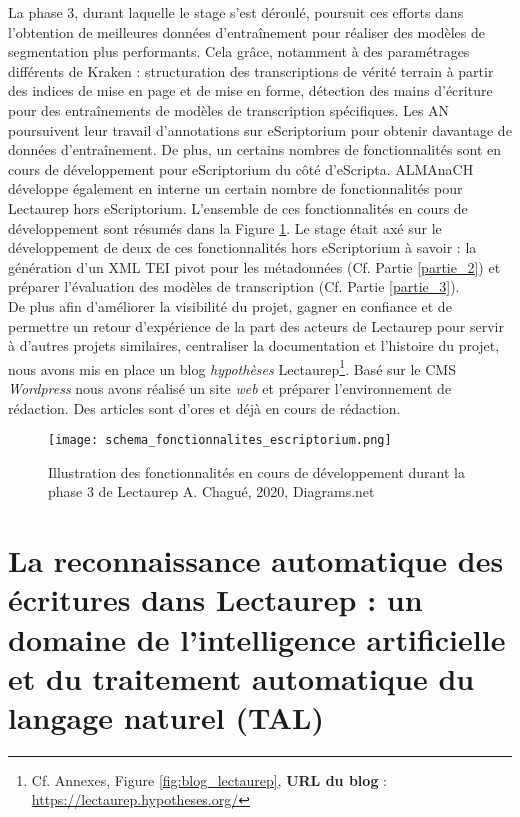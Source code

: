 La phase 3, durant laquelle le stage s'est déroulé, poursuit ces efforts dans l'obtention de meilleures données d'entraînement pour réaliser des modèles de segmentation plus performants. Cela grâce, notamment à des paramétrages différents de Kraken : structuration des transcriptions de vérité terrain à partir des indices de mise en page et de mise en forme, détection des mains d'écriture pour des entraînements de modèles de transcription spécifiques. Les AN poursuivent leur travail d'annotations sur eScriptorium pour obtenir davantage de données d'entraînement. De plus, un certains nombres de fonctionnalités sont en cours de développement pour eScriptorium du côté d'eScripta. ALMAnaCH développe également en interne un certain nombre de fonctionnalités pour Lectaurep hors eScriptorium. L'ensemble de ces fonctionnalités en cours de développement sont résumés dans la Figure \ref{fig:fonctionnalites_eScripto}. Le stage était axé sur le développement de deux de ces fonctionnalités hors eScriptorium à savoir : la génération d'un XML TEI pivot pour les métadonnées (Cf. Partie \ref{partie_2}) et préparer l'évaluation des modèles de transcription (Cf. Partie \ref{partie_3}).\\

De plus afin d'améliorer la visibilité du projet, gagner en confiance et de permettre un retour d'expérience de la part des acteurs de Lectaurep pour servir à d'autres projets similaires, centraliser la documentation et l'histoire du projet, nous avons mis en place un blog \textit{hypothèses} Lectaurep\footnote{Cf. Annexes, Figure \ref{fig:blog_lectaurep}, \textbf{URL du blog} : \url{https://lectaurep.hypotheses.org/}}. Basé sur le CMS \textit{Wordpress} nous avons réalisé un site \textit{web} et préparer l'environnement de rédaction. Des articles sont d'ores et déjà en cours de rédaction.

\begin{figure}[h!]
  \begin{sideways}
    \texttt{[image: schema\_fonctionnalites\_escriptorium.png]}
  \end{sideways}
  \centering
  \caption{Illustration des fonctionnalités en cours de développement durant la phase 3 de Lectaurep \textcopyright A. Chagué, 2020, Diagrams.net}
  \label{fig:fonctionnalites_eScripto}
\end{figure}
\clearpage

\chapter{La reconnaissance automatique des écritures dans Lectaurep : un domaine de l'intelligence artificielle et du traitement automatique du langage naturel (TAL)}

